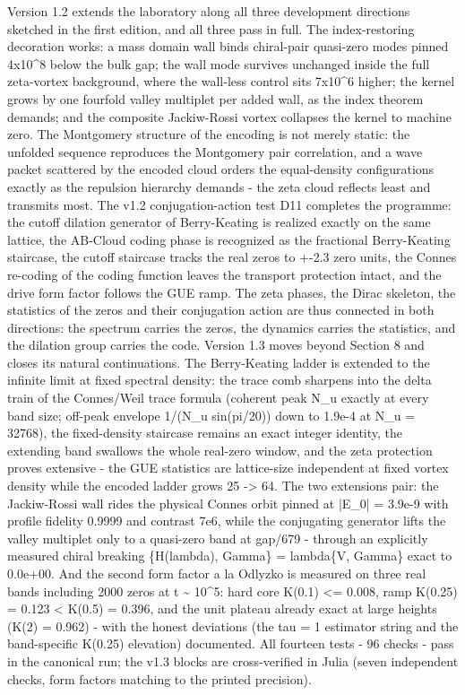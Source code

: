 \documentclass[11pt,a4paper]{article}
\begin{document}
Version 1.2 extends the laboratory along all three development directions sketched in the first edition, and all three pass in full. The index-restoring decoration works: a mass domain wall binds chiral-pair quasi-zero modes pinned 4x10\^{}8 below the bulk gap; the wall mode survives unchanged inside the full zeta-vortex background, where the wall-less control sits 7x10\^{}6 higher; the kernel grows by one fourfold valley multiplet per added wall, as the index theorem demands; and the composite Jackiw-Rossi vortex collapses the kernel to machine zero. The Montgomery structure of the encoding is not merely static: the unfolded sequence reproduces the Montgomery pair correlation, and a wave packet scattered by the encoded cloud orders the equal-density configurations exactly as the repulsion hierarchy demands - the zeta cloud reflects least and transmits most. The v1.2 conjugation-action test D11 completes the programme: the cutoff dilation generator of Berry-Keating is realized exactly on the same lattice, the AB-Cloud coding phase is recognized as the fractional Berry-Keating staircase, the cutoff staircase tracks the real zeros to +-2.3 zero units, the Connes re-coding of the coding function leaves the transport protection intact, and the drive form factor follows the GUE ramp. The zeta phases, the Dirac skeleton, the statistics of the zeros and their conjugation action are thus connected in both directions: the spectrum carries the zeros, the dynamics carries the statistics, and the dilation group carries the code. Version 1.3 moves beyond Section 8 and closes its natural continuations. The Berry-Keating ladder is extended to the infinite limit at fixed spectral density: the trace comb sharpens into the delta train of the Connes/Weil trace formula (coherent peak N\_\allowbreak{}u exactly at every band size; off-peak envelope 1/(N\_\allowbreak{}u sin(pi/20)) down to 1.9e-4 at N\_\allowbreak{}u = 32768), the fixed-density staircase remains an exact integer identity, the extending band swallows the whole real-zero window, and the zeta protection proves extensive - the GUE statistics are lattice-size independent at fixed vortex density while the encoded ladder grows 25 -> 64. The two extensions pair: the Jackiw-Rossi wall rides the physical Connes orbit pinned at |E\_\allowbreak{}0| = 3.9e-9 with profile fidelity 0.9999 and contrast 7e6, while the conjugating generator lifts the valley multiplet only to a quasi-zero band at gap/679 - through an explicitly measured chiral breaking \{H(lambda), Gamma\} = lambda\{V, Gamma\} exact to 0.0e+00. And the second form factor a la Odlyzko is measured on three real bands including 2000 zeros at t \textasciitilde{} 10\^{}5: hard core K(0.1) <= 0.008, ramp K(0.25) = 0.123 < K(0.5) = 0.396, and the unit plateau already exact at large heights (K(2) = 0.962) - with the honest deviations (the tau = 1 estimator string and the band-specific K(0.25) elevation) documented. All fourteen tests - 96 checks - pass in the canonical run; the v1.3 blocks are cross-verified in Julia (seven independent checks, form factors matching to the printed precision).
\end{document}
